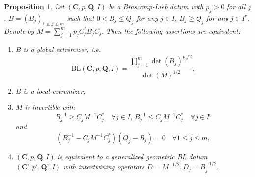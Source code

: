 \documentclass[11pt,a4paper,reqno]{amsart}
\numberwithin{equation}{section}
\newtheorem{proposition}[theorem]{Proposition}
\theoremstyle{definition}
\newcommand{\<}{\ensuremath \leq}
\renewcommand{\>}{\ensuremath \geq}
\begin{document}
\begin{proposition} \label{Prop_Equiv_BL_constant}
    Let $(\textbf{C},p,\textbf{Q},I)$ be a Brascamp-Lieb datum with $p_j>0$ for all $j$, $B=(B_j)_{1 \leq j \leq m}$ such that $0<B_j \leq Q_j$ for any $j \in I$, $B_j \ge Q_j$ for any $j \in I^c.$ Denote by $M=\sum_{j=1}^m p_jC_j^* B_jC_j.$ Then the following assertions are equivalent: 
    \begin{enumerate}
        \item [(a)] $B$ is a global extremizer, \textit{i.e.} $$\mathrm{BL}(\textbf{C},p,\textbf{Q},I)=\frac{\prod_{j=1}^m \det(B_j)^{p_j/2}}{\det(M)^{1/2}},$$
        \item[(b)] $B$ is a local extremizer,
        \item[(c)] $M$ is invertible with $$B_j^{-1} \geq C_jM^{-1}C_j^* \quad \forall j \in I,\, B_j^{-1} \le C_jM^{-1}C_j^* \quad \forall j \in I^c$$ and $$ (B_j^{-1}-C_jM^{-1}C_j^*)(Q_j-B_j)=0 \quad \forall 1 \leq j \leq m,$$
        \item[(d)] $(\textbf{C},p,\textbf{Q},I)$ is equivalent to a generalized geometric BL datum $(\textbf{C'},p',\textbf{Q'},I)$ with intertwining operators $D=M^{-1/2}, D_j=B_j^{-1/2}.$
    \end{enumerate}
\end{proposition}
\end{document}
